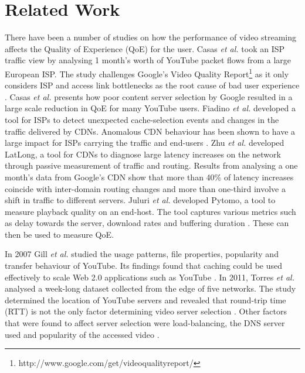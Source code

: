 \documentclass{sig-alternate-05-2015}
\begin{document}
\section{Related Work}\label{sec:related}
There have been a number of studies on how the performance of video streaming affects the Quality of Experience (QoE) for the user. Casas \textit{et al.} \cite{6975242} took an ISP traffic view by analysing 1 month's worth of YouTube packet flows from a large European ISP. The study challenges Google's Video Quality Report\footnote{http://www.google.com/get/videoqualityreport/} as it only considers ISP and access link bottlenecks as the root cause of bad user experience \cite{6975242}. Casas \textit{et al.} \cite{6975242} presents how poor content server selection by Google resulted in a large scale reduction in QoE for many YouTube users. Fiadino \textit{et al.} \cite{6932930} developed a tool for ISPs to detect unexpected cache-selection events and changes in the traffic delivered by CDNs. Anomalous CDN behaviour has been shown to have a large impact for ISPs carrying the traffic and end-users \cite{6932930, Plissonneau:2012:LVH:2155555.2155588}. Zhu \textit{et al.} \cite{6233056} developed LatLong, a tool for CDNs to diagnose large latency increases on the network through passive measurement of traffic and routing. Results from analysing a one month's data from Google's CDN show that more than 40\% of latency increases coincide with inter-domain routing changes and more than one-third involve a shift in traffic to different servers. Juluri \textit{et al.} \cite{6038496} developed Pytomo, a tool to measure playback quality on an end-host. The tool captures various metrics such as delay towards the server, download rates and buffering duration \cite{6038496}. These can then be used to measure QoE.

In 2007 Gill \textit{et al.} \cite{Gill:2007:YTC:1298306.1298310} studied the usage patterns, file properties, popularity and transfer behaviour of YouTube. Its findings found that caching could be used effectively to scale Web 2.0 applications such as YouTube \cite{Gill:2007:YTC:1298306.1298310}. In 2011, Torres \textit{et al.} \cite{5961681} analysed a week-long dataset collected from the edge of five networks. The study determined the location of YouTube servers and revealed that round-trip time (RTT) is not the only factor determining video server selection \cite{5961681}. Other factors that were found to affect server selection were load-balancing, the DNS server used and popularity of the accessed video \cite{5961681}.
\end{document}
